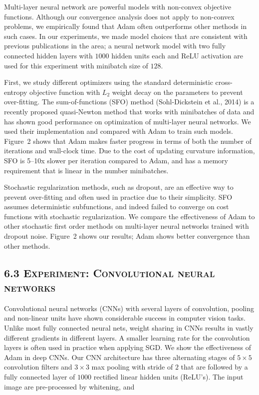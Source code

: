 \documentclass[11pt]{article}
\begin{document}
Multi-layer neural network are powerful models with non-convex
objective functions. Although our convergence analysis does not
apply to non-convex problems, we empirically found that Adam
often outperforms other methods in such cases. In our
experiments, we made model choices that are consistent with
previous publications in the area; a neural network model with
two fully connected hidden layers with $1000$ hidden units each
and ReLU activation are used for this experiment with minibatch
size of $128$.

First, we study different optimizers using the standard
deterministic cross-entropy objective function with $L_2$ weight
decay on the parameters to prevent over-fitting. The
sum-of-functions (SFO) method (Sohl-Dickstein et al., 2014) is a
recently proposed quasi-Newton method that works with minibatches
of data and has shown good performance on optimization of
multi-layer neural networks. We used their implementation and
compared with Adam to train such models. Figure~2 shows that
Adam makes faster progress in terms of both the number of
iterations and wall-clock time. Due to the cost of updating
curvature information, SFO is 5--10x slower per iteration
compared to Adam, and has a memory requirement that is linear in
the number minibatches.

Stochastic regularization methods, such as dropout, are an
effective way to prevent over-fitting and often used in practice
due to their simplicity. SFO assumes deterministic
subfunctions, and indeed failed to converge on cost functions
with stochastic regularization. We compare the effectiveness of
Adam to other stochastic first order methods on multi-layer
neural networks trained with dropout noise. Figure~2 shows our
results; Adam shows better convergence than other methods.

\vspace{0.5em}

\subsection*{6.3 \textsc{Experiment: Convolutional neural networks}}

Convolutional neural networks (CNNs) with several layers of
convolution, pooling and non-linear units have shown considerable
success in computer vision tasks. Unlike most fully connected
neural nets, weight sharing in CNNs results in vastly different
gradients in different layers. A smaller learning rate for the
convolution layers is often used in practice when applying SGD.
We show the effectiveness of Adam in deep CNNs. Our CNN
architecture has three alternating stages of $5 \times 5$
convolution filters and $3 \times 3$ max pooling with stride of
$2$ that are followed by a fully connected layer of $1000$
rectified linear hidden units (ReLU's). The input image are
pre-processed by whitening, and

\end{document}
